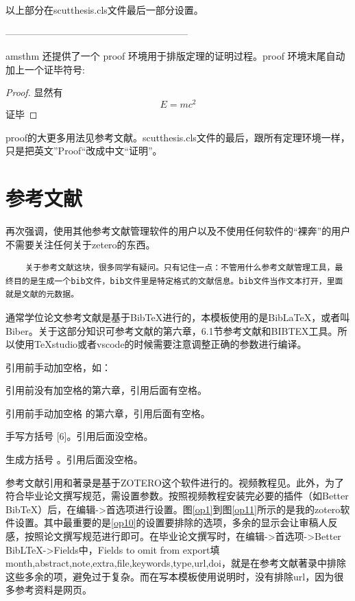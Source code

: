 以上部分在scutthesis.cls文件最后一部分设置。

---------------------------------------------------------

amsthm 还提供了一个 proof 环境用于排版定理的证明过程。proof 环境末尾自动加上一个证毕符号:
\begin{proof}
	显然有
	\[
		E=mc^2
	\]
	证毕
\end{proof}

proof的大更多用法见参考文献\cite{_g}。scutthesis.cls文件的最后，跟所有定理环境一样，只是把英文”Proof“改成中文“证明”。

\section{参考文献}

再次强调，使用其他参考文献管理软件的用户以及不使用任何软件的“裸奔”的用户不需要关注任何关于zetero的东西。
\begin{lstlisting}
	关于参考文献这块，很多同学有疑问。只有记住一点：不管用什么参考文献管理工具，最终目的是生成一个bib文件，bib文件里是特定格式的文献信息。bib文件当作文本打开，里面就是文献的元数据。
\end{lstlisting}

通常学位论文参考文献是基于BibTeX进行的，本模板使用的是BibLaTeX，或者叫Biber。关于这部分知识可参考文献\parencite{_c,_g}的第六章，6.1节参考文献和BIBTEX工具。所以使用TeXstudio或者vscode的时候需要注意调整正确的参数进行编译。

引用前手动加空格，如：

引用前没有加空格\parencite{_c,_g}的第六章，引用后面有空格。

引用前手动加空格 \parencite{_c,_g}的第六章，引用后面有空格。

手写方括号 [6]。引用后面没空格。

生成方括号 \parencite{_k}。引用后面没空格。


参考文献引用和著录是基于ZOTERO这个软件进行的。视频教程见\parencite{_k}。此外，为了符合毕业论文撰写规范，需设置参数。按照视频教程安装完必要的插件（如Better BibTeX）后，在编辑->首选项进行设置。图\ref{op1}到图\ref{op11}所示的是我的zotero软件设置。其中最重要的是\ref{op10}的设置要排除的选项，多余的显示会让审稿人反感，按照论文撰写规范进行即可。在毕业论文撰写时，在编辑->首选项->Better BibLTeX->Fields中，Fields to omit from export填month,abstract,note,extra,file,keywords,type,url,doi，就是在参考文献著录中排除这些多余的项，避免过于复杂。而在写本模板使用说明时，没有排除url，因为很多参考资料是网页。


